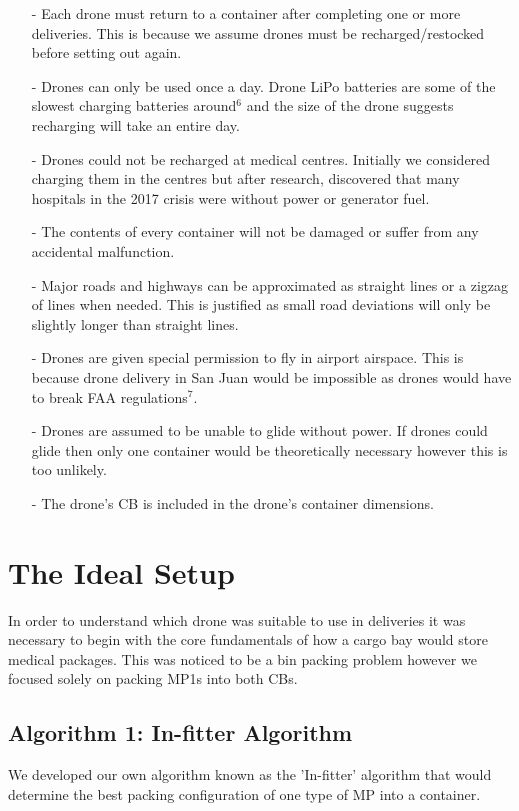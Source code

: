 \documentclass[a4paper,12pt]{article}
\begin{document}
\begin{itemize}
\item[-]Each drone must return to a container after completing one or more deliveries.
        This is because we assume drones must be recharged/restocked before setting out again.
\item[-]Drones can only be used once a day. Drone LiPo batteries are some of the slowest charging batteries around$^{6}$ and
        the size of the drone suggests recharging will take an entire day.
\item[-]Drones could not be recharged at medical centres.
        Initially we considered charging them in the centres but after research, discovered that
        many hospitals in the 2017 crisis were without power or generator fuel.
\item[-]The contents of every container will not be damaged or suffer from any accidental malfunction.
\item[-]Major roads and highways can be approximated as straight lines or a zigzag of lines when needed. This is justified as small road deviations will only be slightly longer than straight lines.
\item[-]Drones are given special permission to fly in airport airspace. This is because drone delivery in San Juan would be impossible as drones would have to break FAA regulations$^7$.
\item[-]Drones are assumed to be unable to glide without power. If drones could glide then only one container would be theoretically necessary however this is too unlikely.
\item[-]The drone's CB is included in the drone's container dimensions.
\end{itemize}

\section{The Ideal Setup}

In order to understand which drone was suitable to use in deliveries it was necessary to begin with the core fundamentals
of how a cargo bay would store medical packages. This was noticed to be a bin packing problem however we focused solely on packing MP1s into both CBs.

\subsection{Algorithm 1: In-fitter Algorithm}
We developed our own algorithm known as the 'In-fitter' algorithm that would determine the best packing configuration of one type of MP into a container.
\end{document}
